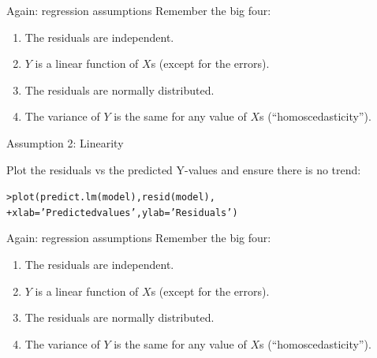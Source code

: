 \documentclass{beamer}\usepackage[]{graphicx}\usepackage[]{color}
\makeatletter
\newcommand{\hlstr}[1]{\textcolor[rgb]{1,0.894,0.71}{#1}}%
\newcommand{\hlstd}[1]{\textcolor[rgb]{1,0.894,0.769}{#1}}%
\newcommand{\hlkwc}[1]{\textcolor[rgb]{0.78,0.941,0.545}{#1}}%
\newcommand{\hlkwd}[1]{\textcolor[rgb]{1,0.78,0.769}{#1}}%
\newenvironment{kframe}{%
 \def\at@end@of@kframe{}%
 \ifinner\ifhmode%
  \def\at@end@of@kframe{\end{minipage}}%
  \begin{minipage}{\columnwidth}%
 \fi\fi%
 \def\FrameCommand##1{\hskip\@totalleftmargin \hskip-\fboxsep
 \colorbox{shadecolor}{##1}\hskip-\fboxsep
     \hskip-\linewidth \hskip-\@totalleftmargin \hskip\columnwidth}%
 \MakeFramed {\advance\hsize-\width
   \@totalleftmargin\z@ \linewidth\hsize
   \@setminipage}}%
 {\par\unskip\endMakeFramed%
 \at@end@of@kframe}
\newenvironment{knitrout}{}{} %
\makeatother
\begin{document}
\begin{darkframes}
    
    \begin{frame}{Again: regression assumptions}
    \fontsize{9}{9}\selectfont
      Remember the big four:
      \begin{enumerate}
        \item The residuals are independent.
        \item \alert{$Y$ is a linear function of $X$s (except for the errors).}
        \item The residuals are normally distributed.
        \item The variance of $Y$ is the same for any value of $X$s (``homoscedasticity'').
      \end{enumerate}
    \end{frame}
    
    
    
    \begin{frame}[fragile]{Assumption 2: Linearity}
    
      Plot the residuals vs the predicted Y-values and ensure there is no trend:
\begin{knitrout}
\begin{kframe}
\begin{alltt}
\hlstd{> }\hlkwd{plot}\hlstd{(}\hlkwd{predict.lm}\hlstd{(model),} \hlkwd{resid}\hlstd{(model),}
\hlstd{+ }  \hlkwc{xlab}\hlstd{=}\hlstr{'Predicted values'}\hlstd{,} \hlkwc{ylab}\hlstd{=}\hlstr{'Residuals'}\hlstd{)}
\end{alltt}
\end{kframe}


\end{knitrout}
    \end{frame}   
    
    
    \begin{frame}{Again: regression assumptions}
    \fontsize{9}{9}\selectfont
      Remember the big four:
      \begin{enumerate}
        \item The residuals are independent.
        \item $Y$ is a linear function of $X$s (except for the errors).
        \item \alert{The residuals are normally distributed.}
        \item The variance of $Y$ is the same for any value of $X$s (``homoscedasticity'').
      \end{enumerate}
    \end{frame}
    

\end{darkframes}
\end{document}
